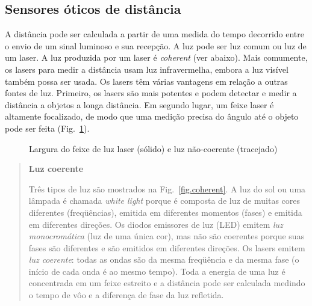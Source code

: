 \subsection{Sensores óticos de distância}\label{s.optical-distance}

A distância pode ser calculada a partir de uma medida do tempo decorrido entre o envio de um sinal luminoso e sua recepção. A luz pode ser luz comum ou luz de um laser. A luz produzida por um laser é \emph{coherent} (ver abaixo).  Mais comumente, os lasers para medir a distância usam luz infravermelha, embora a luz visível também possa ser usada. Os lasers têm várias vantagens em relação a outras fontes de luz. Primeiro, os lasers são mais potentes e podem detectar e medir a distância a objetos a longa distância. Em segundo lugar, um feixe laser é altamente focalizado, de modo que uma medição precisa do ângulo até o objeto pode ser feita (Fig.~\ref{fig.beam}).

\begin{figure}
\begin{center}
\end{center}
\caption{Largura do feixe de luz laser (sólido) e luz não-coerente (tracejado)}\label{fig.beam}
\end{figure}

\begin{quote}
\begin{center}
\textbf{Luz coerente}
\end{center}
Três tipos de luz são mostrados na Fig.~\ref{fig.coherent}. A luz do sol ou uma lâmpada é chamada \emph{white light} porque é composta de luz de muitas cores diferentes (freqüências), emitida em diferentes momentos (fases) e emitida em diferentes direções. Os diodos emissores de luz (LED) emitem \emph{luz monocromática} (luz de uma única cor), mas não são coerentes porque suas fases são diferentes e são emitidos em diferentes direções. Os lasers emitem \emph{ luz coerente}: todas as ondas são da mesma freqüência e da mesma fase (o início de cada onda é ao mesmo tempo). Toda a energia de uma luz é concentrada em um feixe estreito e a distância pode ser calculada medindo o tempo de vôo e a diferença de fase da luz refletida.
\end{quote}


